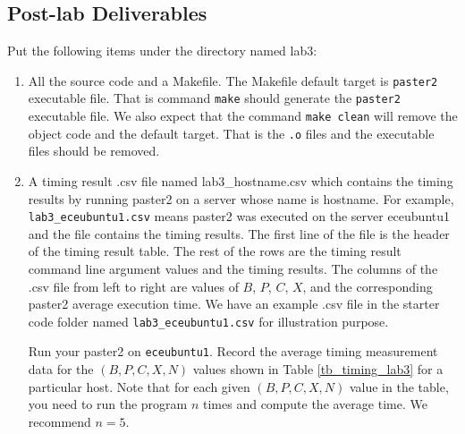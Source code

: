\subsection{Post-lab Deliverables}
\label{sec:lab3:postlab}
Put the following items under the directory named lab3:
\begin{enumerate}
\item All the source code and a Makefile. The Makefile default target is \verb+paster2+ executable file. That is command \verb+make+ should generate the \verb+paster2+ executable file. We also expect that the command \verb+make clean+ will remove the object code and the default target. That is the \verb+.o+ files and the executable files should be removed.
\item A timing result .csv file named lab3\_hostname.csv 
  which contains the timing results by running paster2 on a server whose name is hostname. For example, \verb+lab3_eceubuntu1.csv+ means paster2 was executed on the server eceubuntu1 and the file contains the timing results.
  The first line of the file is the header of the timing result table. The rest of the rows are the timing result command line argument values and the timing results. The columns of the .csv file from left to right are values of $B$, $P$, $C$, $X$, and the corresponding paster2 average execution time. We have an example .csv file in the starter code folder named \verb+lab3_eceubuntu1.csv+ for illustration purpose.

  Run your paster2 on \verb+eceubuntu1+. Record the average timing measurement data for the $(B, P, C, X, N)$ values shown in Table \ref{tb_timing_lab3} for a particular host. Note that for each given $(B, P, C, X, N)$ value in the table, you need to run the program $n$ times and compute the average time. We recommend $n=5$.


\end{enumerate}
